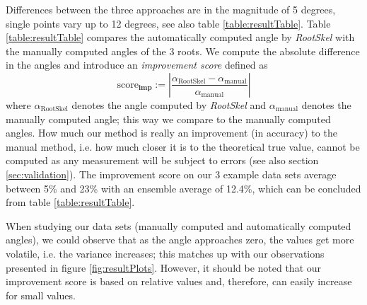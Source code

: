 Differences between the three approaches are in the magnitude of 5 degrees, single points vary up to 12 degrees, see also table \ref{table:resultTable}.
Table \ref{table:resultTable} compares the automatically computed angle by \textit{RootSkel} with the manually computed angles of the 3 roots. We compute the absolute difference in the angles and introduce an \textit{improvement score} defined as 
\[
 \text{score}_{\textbf{imp}} := | \frac{ \alpha_{\text{RootSkel}} - \alpha_{\text{manual}} }{\alpha_{\text{manual}}} |
\]
where $\alpha_{\text{RootSkel}}$ denotes the angle computed by \textit{RootSkel} and $\alpha_{\text{manual}}$ denotes the manually computed angle; this way we compare to the manually computed angles. How much our method is really an improvement (in accuracy) to the manual method, i.e. how much closer it is to the theoretical true value, cannot be computed as any measurement will be subject to errors (see also section \ref{sec:validation}). The improvement score on our 3 example data sets average between 5\% and 23\% with an ensemble average of 12.4\%, which can be concluded from table \ref{table:resultTable}.

When studying our data sets (manually computed and automatically computed angles), we could observe that as the angle approaches zero, the values get more volatile, i.e. the variance increases; this matches up with our observations presented in figure \ref{fig:resultPlots}. However, it should be noted that our improvement score is based on relative values and, therefore, can easily increase for small values. %


